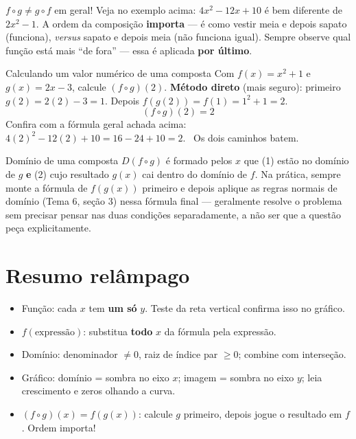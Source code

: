 \documentclass[12pt,a4paper]{article}
\begin{document}
\begin{atencao}{$f\circ g \neq g\circ f$ em geral!}
Veja no exemplo acima: $4x^2-12x+10$ é bem diferente de $2x^2-1$. A ordem
da composição \textbf{importa} — é como vestir meia e depois sapato
(funciona), \emph{versus} sapato e depois meia (não funciona igual).
Sempre observe qual função está mais ``de fora'' — essa é aplicada
\textbf{por último}.
\end{atencao}

\begin{exemplo}{Calculando um valor numérico de uma composta}
Com $f(x)=x^2+1$ e $g(x)=2x-3$, calcule $(f\circ g)(2)$.
\textbf{Método direto} (mais seguro): primeiro $g(2)=2(2)-3=1$. Depois
$f(g(2))=f(1)=1^2+1=2$.
\[
(f\circ g)(2) = 2
\]
Confira com a fórmula geral achada acima: $4(2)^2-12(2)+10 = 16-24+10=2$.
\checkmark\ Os dois caminhos batem.
\end{exemplo}

\begin{dica}{Domínio de uma composta}
$D(f\circ g)$ é formado pelos $x$ que (1) estão no domínio de $g$ \textbf{e}
(2) cujo resultado $g(x)$ cai dentro do domínio de $f$. Na prática, sempre
monte a fórmula de $f(g(x))$ primeiro e depois aplique as regras normais de
domínio (Tema 6, seção 3) nessa fórmula final — geralmente resolve o
problema sem precisar pensar nas duas condições separadamente, a não ser
que a questão peça explicitamente.
\end{dica}

\section*{Resumo relâmpago}
\begin{itemize}[nosep]
  \item Função: cada $x$ tem \textbf{um só} $y$. Teste da reta vertical confirma isso no gráfico.
  \item $f(\text{expressão})$: substitua \textbf{todo} $x$ da fórmula pela expressão.
  \item Domínio: denominador $\neq0$, raiz de índice par $\ge0$; combine com interseção.
  \item Gráfico: domínio = sombra no eixo $x$; imagem = sombra no eixo $y$; leia crescimento e zeros olhando a curva.
  \item $(f\circ g)(x)=f(g(x))$: calcule $g$ primeiro, depois jogue o resultado em $f$. Ordem importa!
\end{itemize}
\end{document}
